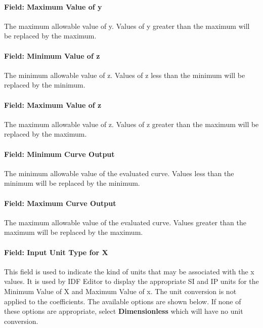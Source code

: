 \paragraph{Field: Maximum Value of y}\label{field-maximum-value-of-y-6}

The maximum allowable value of y. Values of y greater than the maximum will be replaced by the maximum.

\paragraph{Field: Minimum Value of z}\label{field-minimum-value-of-z-2}

The minimum allowable value of z. Values of z less than the minimum will be replaced by the minimum.

\paragraph{Field: Maximum Value of z}\label{field-maximum-value-of-z-2}

The maximum allowable value of z. Values of z greater than the maximum will be replaced by the maximum.

\paragraph{Field: Minimum Curve Output}\label{field-minimum-curve-output-10}

The minimum allowable value of the evaluated curve. Values less than the minimum will be replaced by the minimum.

\paragraph{Field: Maximum Curve Output}\label{field-maximum-curve-output-9}

The maximum allowable value of the evaluated curve. Values greater than the maximum will be replaced by the maximum.

\paragraph{Field: Input Unit Type for X}\label{field-input-unit-type-for-x-11}

This field is used to indicate the kind of units that may be associated with the x values. It is used by IDF Editor to display the appropriate SI and IP units for the Minimum Value of X and Maximum Value of x. The unit conversion is not applied to the coefficients. The available options are shown below. If none of these options are appropriate, select \textbf{Dimensionless} which will have no unit conversion.

